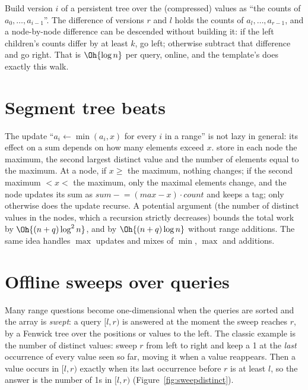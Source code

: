 
\begin{trick}
Build version $i$ of a persistent tree over the (compressed) values as ``the counts of $a_0, \dots, a_{i-1}$''. The difference of
versions $r$ and $l$ holds the counts of $a_l, \dots, a_{r-1}$, and a node-by-node difference can be descended without building it:
if the left children's counts differ by at least $k$, go left; otherwise subtract that difference and go right. That is $\Oh{\log n}$
per query, online, and the template's  does exactly this walk.
\end{trick}

\section[Segment tree beats]{Segment tree beats \hfill \ioi}\label{sec:beats}

The update ``$a_i \leftarrow \min(a_i, x)$ for every $i$ in a range'' is not lazy in general: its effect on a sum depends on how many
elements exceed $x$.  store in each node the maximum, the second largest distinct value and the number of
elements equal to the maximum. At a node, if $x \ge$ the maximum, nothing changes; if the second maximum $< x <$ the maximum, only the
maximal elements change, and the node updates its sum as $\mathit{sum} \mathrel{-}= (\mathit{max} - x) \cdot \mathit{count}$ and
keeps a tag; only otherwise does the update recurse. A potential argument (the number of distinct values in the nodes, which a
recursion strictly decreases) bounds the total work by $\Oh{(n + q) \log^2 n}$, and by $\Oh{(n + q) \log n}$ without range additions.
The same idea handles $\max$ updates and mixes of $\min$, $\max$ and additions.


\section[Offline sweeps]{Offline sweeps over queries \hfill \plat}\label{sec:sweepqueries}

Many range questions become one-dimensional when the queries are sorted and the array is \emph{swept}: a query $[l, r)$ is answered
at the moment the sweep reaches $r$, by a Fenwick tree over the positions or values to the left. The classic example is the number of
distinct values: sweep $r$ from left to right and keep a 1 at the \emph{last} occurrence of every value seen so far, moving it when a
value reappears. Then a value occurs in $[l, r)$ exactly when its last occurrence before $r$ is at least $l$, so the answer is the number
of 1s in $[l, r)$ (Figure~\ref{fig:sweepdistinct}).

